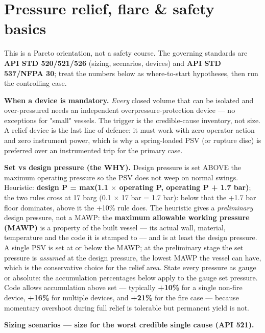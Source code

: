 \documentclass[11pt,a4paper]{article}
\begin{document}
\hypertarget{pressure-relief-flare--safety-basics}{%
\section{Pressure relief, flare \& safety
basics}\label{pressure-relief-flare--safety-basics}}

This is a Pareto orientation, not a safety course. The governing
standards are \textbf{API STD 520/521/526} (sizing, scenarios, devices)
and \textbf{API STD 537/NFPA 30}; treat the numbers below as
where-to-start hypotheses, then run the controlling case.

\textbf{When a device is mandatory.} \emph{Every} closed volume that can
be isolated and over-pressured needs an independent
overpressure-protection device --- no exceptions for "small" vessels.
The trigger is the credible-cause inventory, not size. A relief device
is the last line of defence: it must work with zero operator action and
zero instrument power, which is why a spring-loaded PSV (or rupture
disc) is preferred over an instrumented trip for the primary case.

\textbf{Set vs design pressure (the WHY).} Design pressure is set ABOVE
the maximum operating pressure so the PSV does not weep on normal
swings. Heuristic: \textbf{design P = max(1.1 \(\times\) operating P, operating P
+ 1.7 bar)}; the two rules cross at 17 barg (0.1 \(\times\) 17 bar = 1.7 bar):
below that the +1.7 bar floor dominates, above it the +10\% rule does.
The heuristic gives a \emph{preliminary} design pressure, not a MAWP: the
\textbf{maximum allowable working pressure (MAWP)} is a property of the
built vessel --- its actual wall, material, temperature and the code it is
stamped to --- and is at least the design pressure. A single PSV is set at
or below the MAWP; at the preliminary stage the set pressure is
\emph{assumed} at the design pressure, the lowest MAWP the vessel can have,
which is the conservative choice for the relief area. State every pressure
as gauge or absolute: the accumulation percentages below apply to the
gauge set pressure. Code allows accumulation above set ---
typically \textbf{+10\%} for a single non-fire device, \textbf{+16\%}
for multiple devices, and \textbf{+21\%} for the fire case --- because
momentary overshoot during full relief is tolerable but permanent yield
is not.

\textbf{Sizing scenarios --- size for the worst credible single cause
(API 521).}
\end{document}
